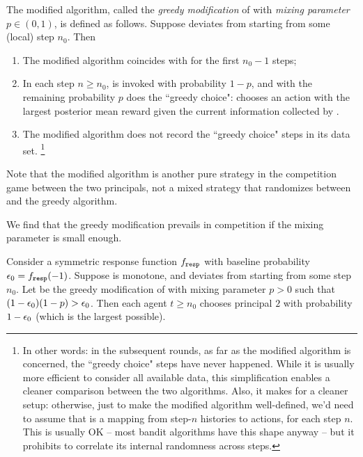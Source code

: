 The modified algorithm, called the \emph{greedy modification} of \alg  with \emph{mixing parameter} $p\in (0,1)$, is defined as follows. Suppose \alg deviates from \DynGreedy starting from some (local) step $n_0$. Then
\begin{enumerate}
\item The modified algorithm coincides with \DynGreedy
for the first $n_0-1$ steps;
\item In each step $n\geq n_0$, \alg is invoked with probability
  $1-p$, and with the remaining probability $p$ does the ``greedy
  choice": chooses an action with the largest posterior mean reward
  given the current information collected by \alg.

\item The modified algorithm does not record the ``greedy choice" steps in its data set.%
    \footnote{In other words: in the subsequent rounds, as far as the modified algorithm is concerned, the ``greedy choice" steps have never happened. While it is usually more efficient to consider all available data, this simplification enables a cleaner comparison between the two algorithms. Also, it makes for  a cleaner setup: otherwise, just to make the modified algorithm well-defined, we'd need to assume that \alg[1] is a mapping from step-$n$ histories to actions, for each step $n$. This is usually OK -- most bandit algorithms have this shape anyway -- but it prohibits \alg[1] to correlate its internal randomness across steps.}

\end{enumerate}

\noindent Note that the modified algorithm is another pure strategy in the competition game between the two principals, not a mixed strategy that randomizes between \alg and the greedy algorithm.

We find that the greedy modification prevails in competition if the mixing parameter is small enough.

\begin{theorem}\label{thm:random-greedy}
Consider a symmetric \HardMaxRandom response function $f_{\mathtt{resp}}$ with baseline probability $\epsilon_0 = f_{\mathtt{resp}}(-1)$. Suppose \alg[1] is monotone, and deviates from \DynGreedy starting from some step $n_0$. Let \alg[2] be the greedy modification of \alg[1] with mixing parameter $p>0$ such that
    $(1-\epsilon_0)(1-p)>\epsilon_0$.
Then each agent $t\geq n_0$ chooses principal $2$ with probability $1-\epsilon_0$ (which is the largest possible).
\end{theorem}

